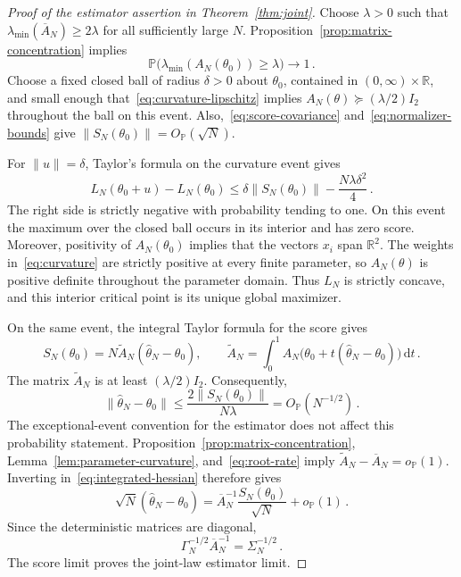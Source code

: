 \documentclass[11pt]{amsart}
\numberwithin{equation}{section}
\theoremstyle{remark}
\newcommand{\Pp}{\mathbb P}
\newcommand{\R}{\mathbb R}
\newcommand{\dd}{\,\mathrm d}
\begin{document}
\begin{proof}[Proof of the estimator assertion in Theorem~\ref{thm:joint}]
Choose $\lambda>0$ such that $\lambda_{\min}(\overline A_N)\ge2\lambda$ for all sufficiently large $N$. Proposition~\ref{prop:matrix-concentration} implies
\begin{equation*}
 \Pp\bigl(\lambda_{\min}(A_N(\theta_0))\ge\lambda\bigr)\longrightarrow1\,.
\end{equation*}
Choose a fixed closed ball of radius $\delta>0$ about $\theta_0$, contained in $(0,\infty)\times\R$, and small enough that~\eqref{eq:curvature-lipschitz} implies $A_N(\theta)\succeq(\lambda/2)I_2$ throughout the ball on this event. Also,~\eqref{eq:score-covariance} and~\eqref{eq:normalizer-bounds} give $\|S_N(\theta_0)\|=O_{\Pp}(\sqrt N)$.

For $\|u\|=\delta$, Taylor's formula on the curvature event gives
\begin{equation*}
 L_N(\theta_0+u)-L_N(\theta_0)
 \le\delta\|S_N(\theta_0)\|-\frac{N\lambda\delta^2}{4}\,.
\end{equation*}
The right side is strictly negative with probability tending to one. On this event the maximum over the closed ball occurs in its interior and has zero score. Moreover, positivity of $A_N(\theta_0)$ implies that the vectors $x_i$ span $\R^2$. The weights in~\eqref{eq:curvature} are strictly positive at every finite parameter, so $A_N(\theta)$ is positive definite throughout the parameter domain. Thus $L_N$ is strictly concave, and this interior critical point is its unique global maximizer.

On the same event, the integral Taylor formula for the score gives
\begin{equation}
 S_N(\theta_0)=N\widetilde A_N(\widehat\theta_N-\theta_0),
 \qquad
 \widetilde A_N=\int_0^1
 A_N\bigl(\theta_0+t(\widehat\theta_N-\theta_0)\bigr)\dd t\,.
 \label{eq:integrated-hessian}
\end{equation}
The matrix $\widetilde A_N$ is at least $(\lambda/2)I_2$. Consequently,
\begin{equation}
 \|\widehat\theta_N-\theta_0\|
 \le\frac{2\|S_N(\theta_0)\|}{N\lambda}
 =O_{\Pp}(N^{-1/2})\,.
 \label{eq:root-rate}
\end{equation}
The exceptional-event convention for the estimator does not affect this probability statement. Proposition~\ref{prop:matrix-concentration}, Lemma~\ref{lem:parameter-curvature}, and~\eqref{eq:root-rate} imply $\widetilde A_N-\overline A_N=o_{\Pp}(1)$. Inverting in~\eqref{eq:integrated-hessian} therefore gives
\begin{equation}
 \sqrt N(\widehat\theta_N-\theta_0)
 =\overline A_N^{-1}\frac{S_N(\theta_0)}{\sqrt N}+o_{\Pp}(1)\,.
 \label{eq:estimator-expansion}
\end{equation}
Since the deterministic matrices are diagonal,
\begin{equation*}
 \Gamma_N^{-1/2}\overline A_N^{-1}=\Sigma_N^{-1/2}\,.
\end{equation*}
The score limit proves the joint-law estimator limit.


\end{proof}
\end{document}
